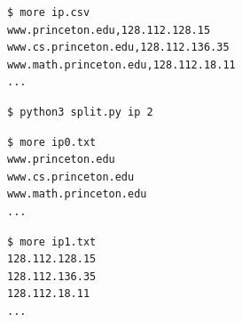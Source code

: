 \documentclass[8pt,a4paper,compress]{beamer}
\begin{document}
\begin{frame}[fragile]
\pause

\begin{lstlisting}[language={},style=focusin]
$ more ip.csv 
www.princeton.edu,128.112.128.15
www.cs.princeton.edu,128.112.136.35
www.math.princeton.edu,128.112.18.11
...
\end{lstlisting}

\pause
\smallskip

\begin{lstlisting}[language={},style=focusin]
$ python3 split.py ip 2
\end{lstlisting}

\pause
\smallskip

\begin{lstlisting}[language={},style=focusin]
$ more ip0.txt
www.princeton.edu
www.cs.princeton.edu
www.math.princeton.edu
...
\end{lstlisting}

\pause
\smallskip

\begin{lstlisting}[language={},style=focusin]
$ more ip1.txt
128.112.128.15
128.112.136.35
128.112.18.11
...
\end{lstlisting}
\end{frame}
\end{document}
